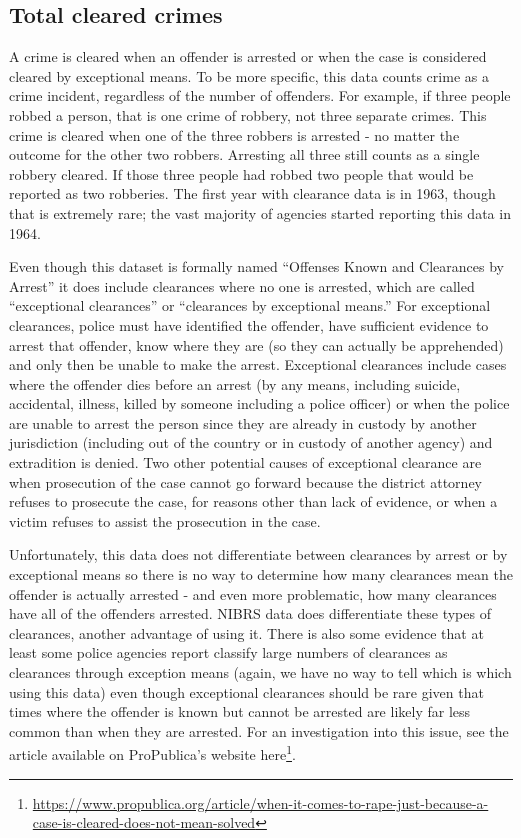 \documentclass[
]{krantz}
\renewcommand{\href}[2]{#2\footnote{\url{#1}}}
\begin{document}
\subsection{Total cleared crimes}\label{clearedCrimes}

A crime is cleared when an offender is arrested or when the
case is considered cleared by exceptional means. To be more
specific, this data counts crime as a crime incident,
regardless of the number of offenders. For example, if three
people robbed a person, that is one crime of robbery, not
three separate crimes. This crime is cleared when one of the
three robbers is arrested - no matter the outcome for the
other two robbers. Arresting all three still counts as a
single robbery cleared. If those three people had robbed two
people that would be reported as two robberies. The first
year with clearance data is in 1963, though that is
extremely rare; the vast majority of agencies started
reporting this data in 1964.

Even though this dataset is formally named ``Offenses Known
and Clearances by Arrest'' it does include clearances where
no one is arrested, which are called ``exceptional
clearances'' or ``clearances by exceptional means.'' For
exceptional clearances, police must have identified the
offender, have sufficient evidence to arrest that offender,
know where they are (so they can actually be apprehended)
and only then be unable to make the arrest. Exceptional
clearances include cases where the offender dies before an
arrest (by any means, including suicide, accidental,
illness, killed by someone including a police officer) or
when the police are unable to arrest the person since they
are already in custody by another jurisdiction (including
out of the country or in custody of another agency) and
extradition is denied. Two other potential causes of
exceptional clearance are when prosecution of the case
cannot go forward because the district attorney refuses to
prosecute the case, for reasons other than lack of evidence,
or when a victim refuses to assist the prosecution in the
case.

Unfortunately, this data does not differentiate between
clearances by arrest or by exceptional means so there is no
way to determine how many clearances mean the offender is
actually arrested - and even more problematic, how many
clearances have all of the offenders arrested. NIBRS data
does differentiate these types of clearances, another
advantage of using it. There is also some evidence that at
least some police agencies report classify large numbers of
clearances as clearances through exception means (again, we
have no way to tell which is which using this data) even
though exceptional clearances should be rare given that
times where the offender is known but cannot be arrested are
likely far less common than when they are arrested. For an
investigation into this issue, see the
\citet{yeung2018comes} article available on ProPublica's
website
\href{https://www.propublica.org/article/when-it-comes-to-rape-just-because-a-case-is-cleared-does-not-mean-solved}{here}.
\end{document}

